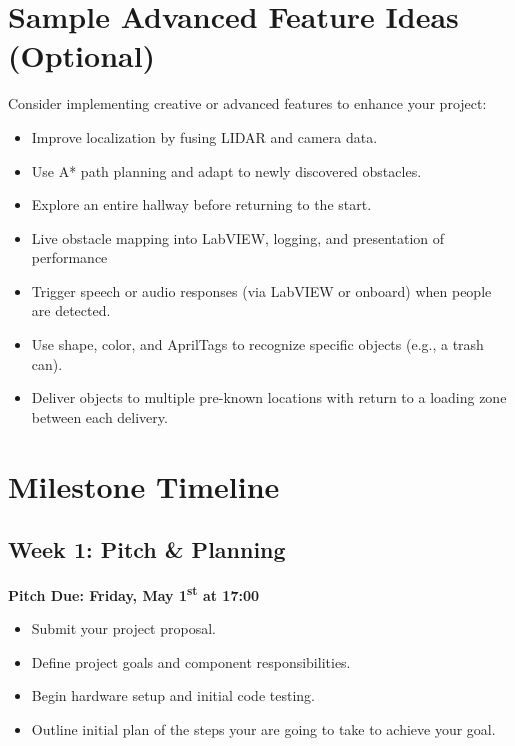 \documentclass[11pt]{article}
\begin{document}
\section*{Sample Advanced Feature Ideas (Optional)}

Consider implementing creative or advanced features to enhance your project:
%
\begin{itemize}
    \item Improve localization by fusing LIDAR and camera data.
    \item Use A* path planning and adapt to newly discovered obstacles.
    \item Explore an entire hallway before returning to the start.
    \item Live obstacle mapping into LabVIEW, logging, and presentation of performance
    \item Trigger speech or audio responses (via LabVIEW or onboard) when people are detected.
    \item Use shape, color, and AprilTags to recognize specific objects (e.g., a trash can).
    \item Deliver objects to multiple pre-known locations with return to a loading zone between each delivery.
\end{itemize}

\section*{Milestone Timeline}

\subsection*{Week 1: Pitch \& Planning}

\textbf{Pitch Due: Friday, May 1\textsuperscript{st} at 17:00}
%
\begin{itemize}
    \item Submit your project proposal.
    \item Define project goals and component responsibilities.
    \item Begin hardware setup and initial code testing.
    \item Outline initial plan of the steps your are going to take to achieve your goal.
\end{itemize}
\end{document}
